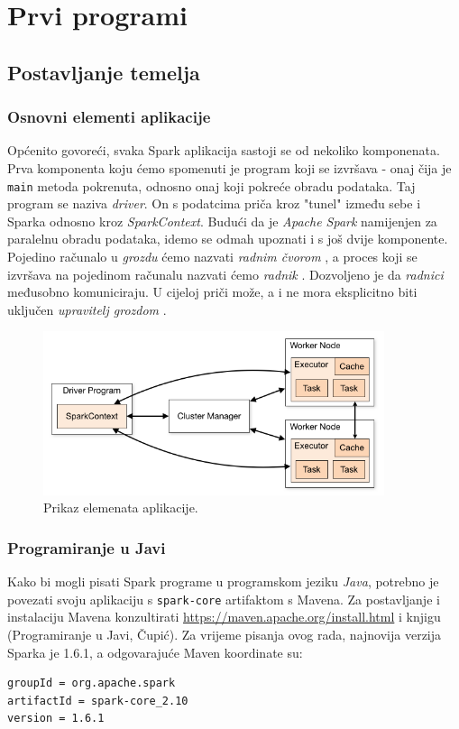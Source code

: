 \documentclass[times, utf8, zavrsni]{fer}
\begin{document}
\chapter{Prvi programi}
\section{Postavljanje temelja}
\subsection{Osnovni elementi aplikacije}
Općenito govoreći, svaka Spark aplikacija sastoji se od nekoliko komponenata. Prva komponenta koju ćemo spomenuti je program koji se izvršava - onaj čija je \texttt{main} metoda pokrenuta, odnosno onaj koji pokreće obradu podataka. Taj program se naziva \emph{driver}. On s podatcima priča kroz "tunel" između sebe i Sparka odnosno kroz \emph{SparkContext}. Budući da je \emph{Apache Spark} namijenjen za paralelnu obradu podataka, idemo se odmah upoznati i s još dvije komponente. Pojedino računalo u \emph{grozdu}  ćemo nazvati \emph{radnim čvorom} , a proces koji se izvršava na pojedinom računalu nazvati ćemo \emph{radnik} . Dozvoljeno je da \emph{radnici} međusobno komuniciraju. U cijeloj priči može, a i ne mora eksplicitno biti uključen \emph{upravitelj grozdom} .


\begin{figure}[htb]
\centering
\includegraphics[width=10cm]{img/cluster-overview.png}
\caption{Prikaz elemenata aplikacije.}
\label{fig:cluster-overview}
\end{figure}
\subsection{Programiranje u Javi}
Kako bi mogli pisati Spark programe u programskom jeziku \emph{Java}, potrebno je povezati svoju aplikaciju s \texttt{spark-core} artifaktom s Mavena. Za postavljanje i instalaciju Mavena konzultirati \url{https://maven.apache.org/install.html} i knjigu (Programiranje u Javi, Čupić). Za vrijeme pisanja ovog rada, najnovija verzija Sparka je 1.6.1, a odgovarajuće Maven koordinate su:
\begin{lstlisting}[language=bash]
groupId = org.apache.spark
artifactId = spark-core_2.10
version = 1.6.1
\end{lstlisting}
\end{document}

